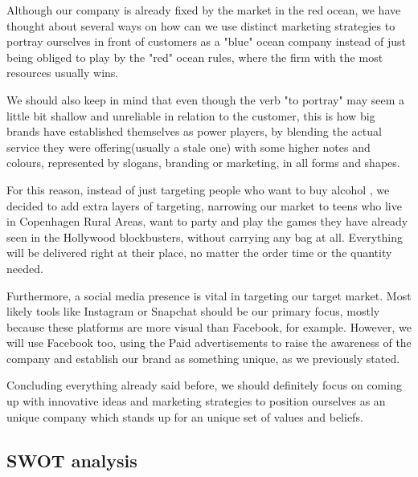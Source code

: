 \documentclass[12p]{article}
\begin{document}
Although our company is already fixed by the market in the red ocean, we have thought about several ways on how can we use distinct marketing strategies to portray ourselves in front of customers as a "blue" ocean company instead of just being obliged to play by the "red" ocean rules, where the firm with the most resources usually wins.

We should also keep in mind that even though the verb "to portray" may seem a little bit shallow and unreliable in relation to the customer, this is how big brands have established themselves as power players, by blending the actual service they were offering(usually a stale one) with some higher notes and colours, represented by slogans, branding or marketing, in all forms and shapes.

For this reason, instead of just targeting people who want to buy alcohol , we decided to add extra layers of targeting, narrowing our market to teens who live in Copenhagen Rural Areas, want to party and play the games they have already seen in the Hollywood blockbusters, without carrying any bag at all. Everything will be delivered right at their place, no matter the order time or the quantity needed.

Furthermore, a social media presence is vital in targeting our target market. Most likely tools like Instagram or Snapchat should be our primary focus, mostly because these platforms are more visual than Facebook, for example. However, we will use Facebook too, using the Paid advertisements to raise the awareness of the company and establish our brand as something unique, as we previously stated. 

Concluding everything already said before, we should definitely focus on coming up with innovative ideas and marketing strategies to position ourselves as an unique company which stands up for an unique set of values and beliefs.


\subsection{SWOT analysis} \label{SWOT}
\end{document}
